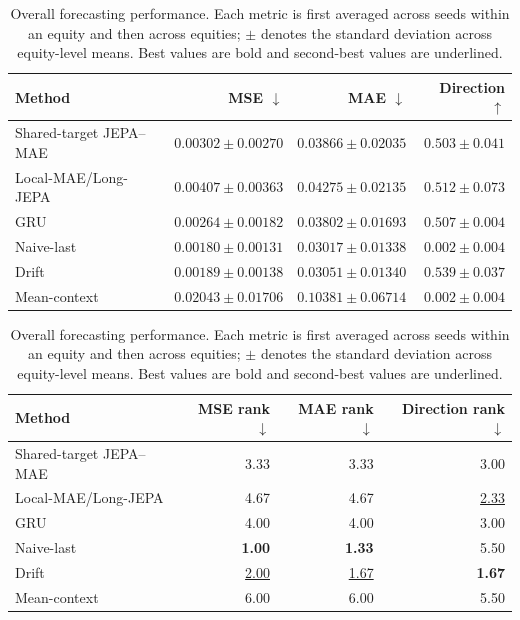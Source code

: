 \begin{table}[t]
\centering
\small
\caption{Overall forecasting performance. Each metric is first averaged across seeds within an equity and then across equities; $\pm$ denotes the standard deviation across equity-level means. Best values are bold and second-best values are underlined.}
\label{tab:main_metrics}
\begin{tabular}{lrrr}
\toprule
Method & MSE $\downarrow$ & MAE $\downarrow$ & Direction $\uparrow$ \\
\midrule
Shared-target JEPA--MAE & $0.00302 \pm 0.00270$ & $0.03866 \pm 0.02035$ & $0.503 \pm 0.041$ \\
Local-MAE/Long-JEPA & $0.00407 \pm 0.00363$ & $0.04275 \pm 0.02135$ & \underline{$0.512 \pm 0.073$} \\
GRU & $0.00264 \pm 0.00182$ & $0.03802 \pm 0.01693$ & $0.507 \pm 0.004$ \\
Naive-last & \textbf{$0.00180 \pm 0.00131$} & \textbf{$0.03017 \pm 0.01338$} & $0.002 \pm 0.004$ \\
Drift & \underline{$0.00189 \pm 0.00138$} & \underline{$0.03051 \pm 0.01340$} & \textbf{$0.539 \pm 0.037$} \\
Mean-context & $0.02043 \pm 0.01706$ & $0.10381 \pm 0.06714$ & $0.002 \pm 0.004$ \\
\bottomrule
\end{tabular}
\par\medskip
\begin{tabular}{lrrr}
\toprule
Method & MSE rank $\downarrow$ & MAE rank $\downarrow$ & Direction rank $\downarrow$ \\
\midrule
Shared-target JEPA--MAE & 3.33 & 3.33 & 3.00 \\
Local-MAE/Long-JEPA & 4.67 & 4.67 & \underline{2.33} \\
GRU & 4.00 & 4.00 & 3.00 \\
Naive-last & \textbf{1.00} & \textbf{1.33} & 5.50 \\
Drift & \underline{2.00} & \underline{1.67} & \textbf{1.67} \\
Mean-context & 6.00 & 6.00 & 5.50 \\
\bottomrule
\end{tabular}
\end{table}
